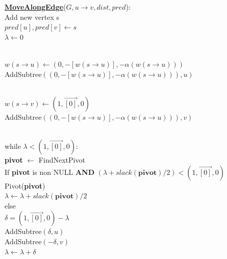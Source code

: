 \documentclass{article}
\begin{document}

\begin{center}
\begin{algorithm}
\textbf{\underline{MoveAlongEdge}}($G, u \rightarrow v, dist, pred$): \\ \quad
Add new vertex s \\ \quad
$pred[u], pred[v] \leftarrow s$ \\ \quad
$\lambda \leftarrow 0$ \\ \\ \quad

$w(s \rightarrow u) \leftarrow ( 0, -[w(s \rightarrow u)], 
-\alpha(w(s \rightarrow u)) )$ \\ \quad
AddSubtree$(( 0, -[w(s \rightarrow u)], 
-\alpha(w(s \rightarrow u)) ), u)$ \\ \\ \quad

$w(s \rightarrow v) \leftarrow ( 1, \vec{[0]}, 0 )$ \\ \quad
AddSubtree$(( 0, -[w(s \rightarrow u)], 
-\alpha(w(s \rightarrow u)) ), v)$ \\ \\ \quad

while $\lambda < ( 1, \vec{[0]}, 0 )$: \\ \quad \quad
    \textbf{pivot} $\leftarrow $ FindNextPivot \\ \quad \quad
    If \textbf{pivot} is non NULL \textbf{AND} 
    $(\lambda + slack(\textbf{pivot}) / 2) < ( 1, \vec{[0]}, 0 )$ \\ \qquad \quad
        Pivot(\textbf{pivot}) \\ \qquad \quad
        $\lambda \leftarrow \lambda + slack(\textbf{pivot}) / 2$ \\ \quad \quad
    else \\ \qquad \quad
        $\delta = ( 1, \vec{[0]}, 0 ) - \lambda$ \\ \qquad \quad
        AddSubtree$(\delta, u)$ \\ \qquad \quad
        AddSubtree$(-\delta, v)$ \\ \qquad \quad
        $\lambda \leftarrow \lambda + \delta$ \\
\end{algorithm}
\end{center}
\end{document}
